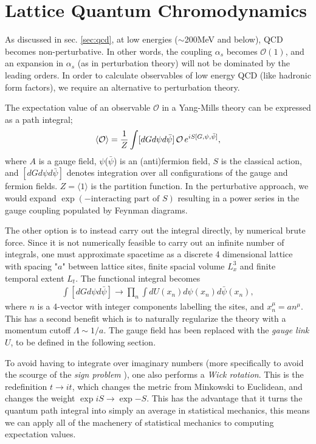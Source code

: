 \chapter{Lattice Quantum Chromodynamics}
\label{chap:latticeqcd}

As discussed in sec. \ref{sec:qcd}, at low energies ($\sim$200MeV and below), QCD becomes non-perturbative. In other words, the coupling $\alpha_s$ becomes $\mathcal{O}(1)$, and an expansion in $\alpha_s$ (as in perturbation theory) will not be dominated by the leading orders. In order to calculate observables of low energy QCD (like hadronic form factors), we require an alternative to perturbation theory.

The expectation value of an observable $\mathcal{O}$ in a Yang-Mills theory can be expressed as a path integral;
\begin{align}
 \langle \mathcal{O} \rangle = {1\over Z}\int [dG d\psi d\bar{\psi}] \, \mathcal{O} \, e^{iS[G,\psi,\bar{\psi}]},
\end{align}
where $A$ is a gauge field, $\psi$($\bar{\psi}$) is an (anti)fermion field, $S$ is the classical action, and $[dG d\psi d\bar{\psi}]$ denotes integration over all configurations of the gauge and fermion fields. $Z = \langle 1 \rangle$ is the partition function. In the perturbative approach, we would expand $\exp(-\text{interacting part of }S )$ resulting in a power series in the gauge coupling populated by Feynman diagrams.

The other option is to instead carry out the integral directly, by numerical brute force. Since it is not numerically feasible to carry out an infinite number of integrals, one must approximate spacetime as a discrete 4 dimensional lattice with spacing "$a$" between lattice sites, finite spacial volume $L_x^3$ and finite temporal extent $L_t$. The functional integral becomes
\begin{align}
 \int [dG d\psi d\bar{\psi}] \to \prod_{n} \int dU(x_n) d\psi(x_n) d\bar{\psi}(x_n),
\end{align}
where $n$ is a 4-vector with integer components labelling the sites, and $x_n^{\mu} = an^{\mu}$.
This has a second benefit which is to naturally regularize the theory with a momentum cutoff $\Lambda \sim 1/a$. The gauge field has been replaced with the {\it{gauge link}} $U$, to be defined in the following section.

To avoid having to integrate over imaginary numbers (more specifically to avoid the scourge of the {\it{sign problem}} \cite{deForcrand:2010ys}), one also performs a {\it{Wick rotation}}. This is the redefinition $t\to it$, which changes the metric from Minkowski to Euclidean, and changes the weight $\exp{iS} \to \exp{-S}$. This has the advantage that it turns the quantum path integral into simply an average in statistical mechanics, this means we can apply all of the machenery of statistical mechanics to computing expectation values.

